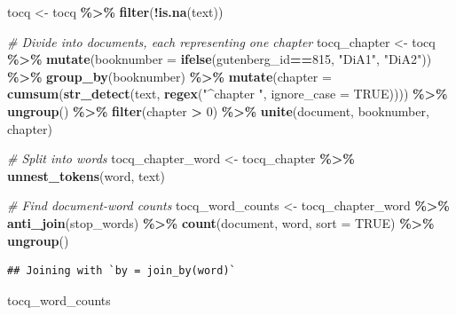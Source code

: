 \documentclass[
]{article}
\newenvironment{Shaded}{\begin{snugshade}}{\end{snugshade}}
\newcommand{\AttributeTok}[1]{\textcolor[rgb]{0.13,0.29,0.53}{#1}}
\newcommand{\CommentTok}[1]{\textcolor[rgb]{0.56,0.35,0.01}{\textit{#1}}}
\newcommand{\ConstantTok}[1]{\textcolor[rgb]{0.56,0.35,0.01}{#1}}
\newcommand{\DecValTok}[1]{\textcolor[rgb]{0.00,0.00,0.81}{#1}}
\newcommand{\FunctionTok}[1]{\textcolor[rgb]{0.13,0.29,0.53}{\textbf{#1}}}
\newcommand{\NormalTok}[1]{#1}
\newcommand{\OtherTok}[1]{\textcolor[rgb]{0.56,0.35,0.01}{#1}}
\newcommand{\SpecialCharTok}[1]{\textcolor[rgb]{0.81,0.36,0.00}{\textbf{#1}}}
\newcommand{\StringTok}[1]{\textcolor[rgb]{0.31,0.60,0.02}{#1}}
\begin{document}
\begin{Shaded}
\begin{Highlighting}[]
\NormalTok{tocq }\OtherTok{\textless{}{-}}\NormalTok{ tocq }\SpecialCharTok{\%\textgreater{}\%}
  \FunctionTok{filter}\NormalTok{(}\SpecialCharTok{!}\FunctionTok{is.na}\NormalTok{(text))}

\CommentTok{\# Divide into documents, each representing one chapter}
\NormalTok{tocq\_chapter }\OtherTok{\textless{}{-}}\NormalTok{ tocq }\SpecialCharTok{\%\textgreater{}\%}
  \FunctionTok{mutate}\NormalTok{(}\AttributeTok{booknumber =} \FunctionTok{ifelse}\NormalTok{(gutenberg\_id}\SpecialCharTok{==}\DecValTok{815}\NormalTok{, }\StringTok{"DiA1"}\NormalTok{, }\StringTok{"DiA2"}\NormalTok{)) }\SpecialCharTok{\%\textgreater{}\%}
  \FunctionTok{group\_by}\NormalTok{(booknumber) }\SpecialCharTok{\%\textgreater{}\%}
  \FunctionTok{mutate}\NormalTok{(}\AttributeTok{chapter =} \FunctionTok{cumsum}\NormalTok{(}\FunctionTok{str\_detect}\NormalTok{(text, }\FunctionTok{regex}\NormalTok{(}\StringTok{"\^{}chapter "}\NormalTok{, }\AttributeTok{ignore\_case =} \ConstantTok{TRUE}\NormalTok{)))) }\SpecialCharTok{\%\textgreater{}\%}
  \FunctionTok{ungroup}\NormalTok{() }\SpecialCharTok{\%\textgreater{}\%}
  \FunctionTok{filter}\NormalTok{(chapter }\SpecialCharTok{\textgreater{}} \DecValTok{0}\NormalTok{) }\SpecialCharTok{\%\textgreater{}\%}
  \FunctionTok{unite}\NormalTok{(document, booknumber, chapter)}

\CommentTok{\# Split into words}
\NormalTok{tocq\_chapter\_word }\OtherTok{\textless{}{-}}\NormalTok{ tocq\_chapter }\SpecialCharTok{\%\textgreater{}\%}
  \FunctionTok{unnest\_tokens}\NormalTok{(word, text)}

\CommentTok{\# Find document{-}word counts}
\NormalTok{tocq\_word\_counts }\OtherTok{\textless{}{-}}\NormalTok{ tocq\_chapter\_word }\SpecialCharTok{\%\textgreater{}\%}
  \FunctionTok{anti\_join}\NormalTok{(stop\_words) }\SpecialCharTok{\%\textgreater{}\%}
  \FunctionTok{count}\NormalTok{(document, word, }\AttributeTok{sort =} \ConstantTok{TRUE}\NormalTok{) }\SpecialCharTok{\%\textgreater{}\%}
  \FunctionTok{ungroup}\NormalTok{()}
\end{Highlighting}
\end{Shaded}

\begin{verbatim}
## Joining with `by = join_by(word)`
\end{verbatim}

\begin{Shaded}
\begin{Highlighting}[]
\NormalTok{tocq\_word\_counts}
\end{Highlighting}
\end{Shaded}
\end{document}
